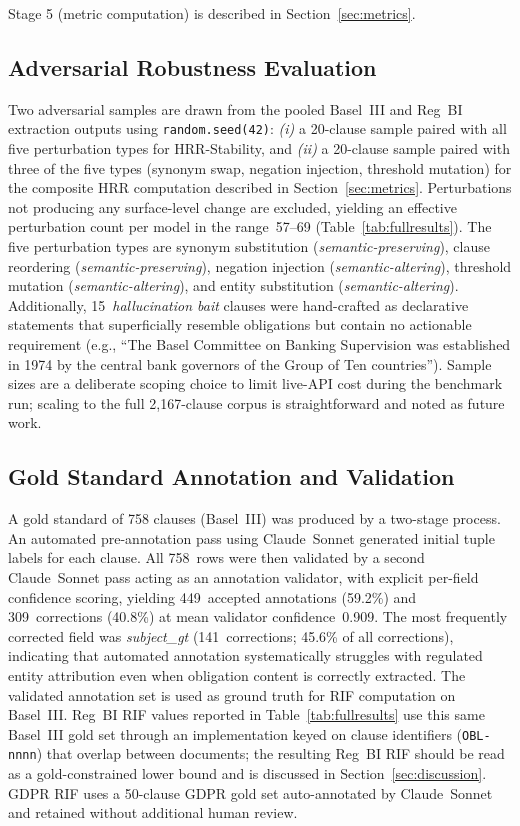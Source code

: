\documentclass{article}
\begin{document}
Stage 5 (metric computation) is described in
Section~\ref{sec:metrics}.

\subsection{Adversarial Robustness Evaluation}
\label{sec:adversarial_eval}

Two adversarial samples are drawn from the pooled Basel~III and Reg~BI
extraction outputs using \texttt{random.seed(42)}:
\textit{(i)} a 20-clause sample paired with all five perturbation
types for HRR-Stability, and \textit{(ii)} a 20-clause sample
paired with three of the five types (synonym swap, negation injection,
threshold mutation) for the composite HRR computation described in
Section~\ref{sec:metrics}.
Perturbations not producing any surface-level change are excluded,
yielding an effective perturbation count per model in the
range~57--69 (Table~\ref{tab:fullresults}).
The five perturbation types are synonym substitution
(\textit{semantic-preserving}), clause reordering
(\textit{semantic-preserving}), negation injection
(\textit{semantic-altering}), threshold mutation
(\textit{semantic-altering}), and entity substitution
(\textit{semantic-altering}).
Additionally, 15~\textit{hallucination bait} clauses were hand-crafted as
declarative statements that superficially resemble obligations but
contain no actionable requirement (e.g., ``The Basel Committee on Banking
Supervision was established in 1974 by the central bank governors of
the Group of Ten countries'').
Sample sizes are a deliberate scoping choice to limit live-API cost
during the benchmark run; scaling to the full 2,167-clause corpus is
straightforward and noted as future work.

\subsection{Gold Standard Annotation and Validation}

A gold standard of 758 clauses (Basel~III) was produced by a two-stage
process.
An automated pre-annotation pass using Claude~Sonnet generated initial
tuple labels for each clause.
All 758~rows were then validated by a second Claude~Sonnet pass acting
as an annotation validator, with explicit per-field confidence scoring,
yielding 449~accepted annotations (59.2\%) and 309~corrections (40.8\%)
at mean validator confidence~0.909.
The most frequently corrected field was \textit{subject\_gt}
(141~corrections; 45.6\% of all corrections), indicating that automated
annotation systematically struggles with regulated entity attribution
even when obligation content is correctly extracted.
The validated annotation set is used as ground truth for RIF
computation on Basel~III.
Reg~BI RIF values reported in Table~\ref{tab:fullresults} use this same
Basel~III gold set through an implementation keyed on clause identifiers
(\texttt{OBL-nnnn}) that overlap between documents; the resulting
Reg~BI RIF should be read as a gold-constrained lower bound and is
discussed in Section~\ref{sec:discussion}.
GDPR RIF uses a 50-clause GDPR gold set auto-annotated by Claude~Sonnet
and retained without additional human review.
\end{document}

